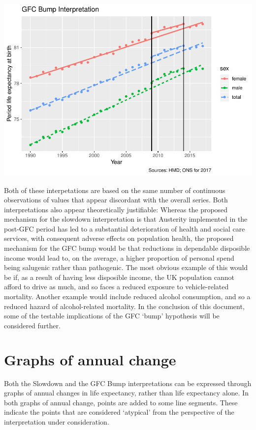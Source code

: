 \documentclass[]{article}
\begin{document}
\includegraphics{devils_advocacy_files/figure-latex/unnamed-chunk-3-1.pdf}

Both of these interpetations are based on the same number of continuous
observations of values that appear discordant with the overall series.
Both interpretations also appear theoretically justifiable: Whereas the
proposed mechanism for the slowdown interpretation is that Austerity
implemented in the post-GFC period has led to a substantial
deterioration of health and social care services, with consequent
adverse effects on population health, the proposed mechanism for the GFC
bump would be that reductions in dependable disposible income would lead
to, on the average, a higher proportion of personal spend being
salugenic rather than pathogenic. The most obvious example of this would
be if, as a result of having less disposible income, the UK population
cannot afford to drive as much, and so faces a reduced exposure to
vehicle-related mortality. Another example would include reduced alcohol
consumption, and so a reduced hazard of alcohol-related mortality. In
the conclusion of this document, some of the testable implications of
the GFC `bump' hypothesis will be considered further.

\section{Graphs of annual change}\label{graphs-of-annual-change}

Both the Slowdown and the GFC Bump interpretations can be expressed
through graphs of annual changes in life expectancy, rather than life
expectancy alone. In both graphs of annual change, points are added to
some line segments. These indicate the points that are considered
`atypical' from the perspective of the interpretation under
consideration.
\end{document}
